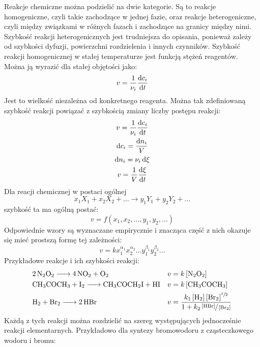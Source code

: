 \documentclass[10pt, a4paper, twoside, onecolumn]{article}
\numberwithin{equation}{section}
\begin{document}
	Reakcje chemiczne można podzielić na dwie kategorie. Są to reakcje homogeniczne, czyli takie zachodzące w jednej fazie, oraz reakcje heterogeniczne, czyli między związkami w różnych fazach i zachodzące na granicy między nimi. Szybkość reakcji heterogenicznych jest trudniejsza do opisania, ponieważ zależy od szybkości dyfuzji, powierzchni rozdzielenia i innych czynników. %
	Szybkość reakcji homogenicznej w stałej temperaturze jest funkcją stężeń reagentów. Można ją wyrazić dla stałej objętości jako: 
	\begin{equation}
		v=\frac{1}{\nu_i}\dv{c_i}{t}
	\end{equation}
	Jest to wielkość niezależna od konkretnego reagenta. Można tak zdefiniowaną szybkość reakcji powiązać z szybkością zmiany liczby postępu reakcji:
	\begin{gather}
		v=\frac{1}{\nu_{i}}\dv{c_{i}}{t} \\
		\dd{c_{i}}=\frac{\dd{n_{i}}}{V} \\
		\dd{n_{i}}=\nu_{i}\dd{\xi} \\
		v=\frac{1}{V}\dv{\xi}{t}
	\end{gather}
	Dla reacji chemicznej w postaci ogólnej
	\begin{equation*}
		x_{1}X_{1}+x_{2}X_{2}+\ldots \rightarrow y_{1}Y_{1}+y_{2}Y_{2}+\ldots
	\end{equation*}
	szybkość ta ma ogólną postać:
	\begin{equation*}
		v=f\left(x_{1}, x_{2}, \ldots, y_{1}, y_{2}, \ldots\right)
	\end{equation*}
	Odpowiednie wzory są wyznaczane empirycznie i znacząca część z nich okazuje się mieć prostszą formę tej zależności:
	\begin{equation}\label{szybkosc reakcji}
		v=k x_{1}^{\alpha_1}x_{2}^{\alpha_2}\ldots y_{1}^{\beta_1}y_{2}^{\beta_2}\ldots
	\end{equation}
	Przykładowe reakcje i ich szybkości reakcji:
	\begin{align*}
		&\ce{2N2O2 -> 4NO2 + O2} &&v=k\left[\ce{N2O2}\right] \\
		&\ce{CH3COCH3 + I2 -> CH3COCH2I + HI} &&v=k\left[\ce{CH3COCH3}\right] \\
		&\ce{H2 + Br2 -> 2HBr} &&v=\frac{k_{1}\left[\ce{H2}\right]\left[\ce{Br2}\right]^{\sfrac{1}{2}}}{1+k_{2}\sfrac{\left[\ce{HBr}\right]}{\left[\ce{Br2}\right]}}
	\end{align*}
	Każdą z tych reakcji można rozdzielić na szereg występujących jednocześnie reakcji elementarnych. Przykładowo dla syntezy bromowodoru z cząsteczkowego wodoru i bromu:
\end{document}
